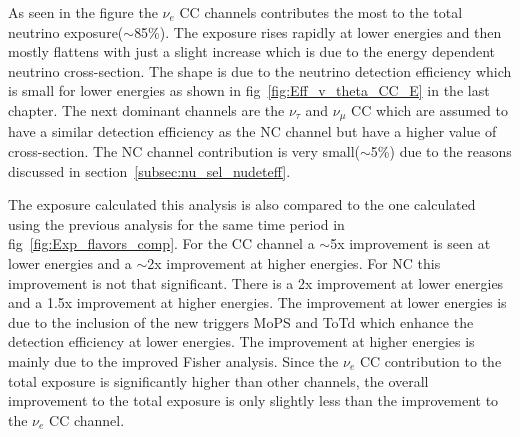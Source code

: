As seen in the figure the $\nu_e$ CC channels contributes the most to the total neutrino exposure($\sim$85\%). The exposure rises rapidly at lower energies and then mostly flattens with just a slight increase which is due to the energy dependent neutrino cross-section. The shape is due to the neutrino detection efficiency which is small for lower energies as shown in fig~\ref{fig:Eff_v_theta_CC_E} in the last chapter. The next dominant channels are the $\nu_{\tau}$ and $\nu_{\mu}$ CC which are assumed to have a similar detection efficiency as the NC channel but have a higher value of cross-section. The NC channel contribution is very small($\sim$5\%) due to the reasons discussed in section~\ref{subsec:nu_sel_nudeteff}.  

The exposure calculated this analysis is also compared to the one calculated using the previous analysis for the same time period in fig~\ref{fig:Exp_flavors_comp}. For the CC channel a $\sim$5x improvement is seen at lower energies and a $\sim$2x improvement at higher energies. For NC this improvement is not that significant. There is a 2x improvement at lower energies and a 1.5x improvement at higher energies. The improvement at lower energies is due to the inclusion of the new triggers MoPS and ToTd which enhance the detection efficiency at lower energies. The improvement at higher energies is mainly due to the improved Fisher analysis. Since the $\nu_e$ CC contribution to the total exposure is significantly higher than other channels, the overall improvement to the total exposure is only slightly less than the improvement to the $\nu_e$ CC channel. 

